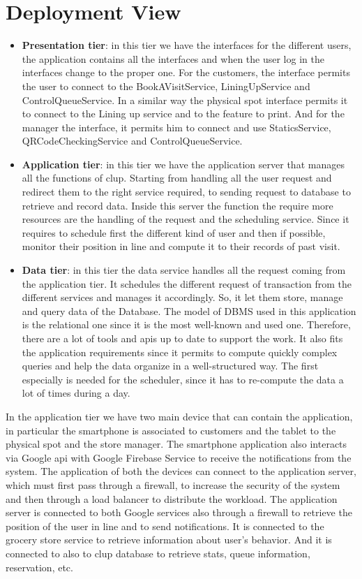 \section{Deployment View}
\begin{itemize}
	\item \textbf{Presentation tier}: in this tier we have the interfaces for the different users, the application contains all the interfaces and when the user log in the interfaces change to the proper one. For the customers, the interface permits the user to connect to the BookAVisitService, LiningUpService and ControlQueueService. In a similar way the physical spot interface permits it to connect to the Lining up service and to the feature to print. And for the manager the interface, it permits him to connect and use StaticsService, QRCodeCheckingService and ControlQueueService.

	\item \textbf{Application tier}: in this tier we have the application server that manages all the functions of \gls{clup}. Starting from handling all the user request and redirect them to the right service required, to sending request to database to retrieve and record data. Inside this server the function the require more resources are the handling of the request and the scheduling service. Since it requires to schedule first the different kind of user and then if possible, monitor their position in line and compute it to their records of past visit.

	\item \textbf{Data tier}: in this tier the data service handles all the request coming from the application tier. It schedules the different request of transaction from the different services and manages it accordingly. So, it let them store, manage and query data of the Database. The model of DBMS used in this application is the relational one since it is the most well-known and used one. Therefore, there are a lot of tools and \glspl{api} up to date to support the work. It also fits the application requirements since it permits to compute quickly complex queries and help the data organize in a well-structured way. The first especially is needed for the scheduler, since it has to re-compute the data a lot of times during a day. 
\end{itemize}
In the application tier we have two main device that can contain the application, in particular the smartphone is associated to customers and the tablet to the physical spot and the store manager. The smartphone application also interacts via Google \gls{api} with Google Firebase Service to receive the notifications from the system. The application of both the devices can connect to the application server, which must first pass through a firewall, to increase the security of the system and then through a load balancer to distribute the workload. 
The application server is connected to both Google services also through a firewall to retrieve the position of the user in line and to send notifications. It is connected to the grocery store service to retrieve information about user’s behavior. And it is connected to also to \gls{clup} database to retrieve stats, queue information, reservation, etc. 

